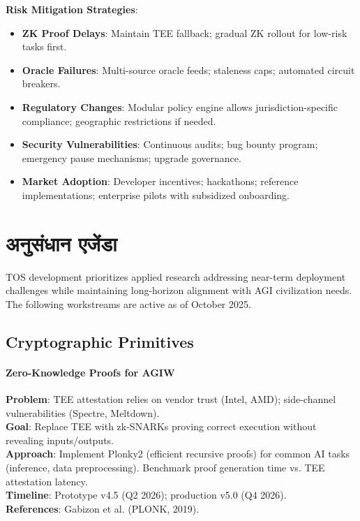\documentclass[11pt]{article}
\begin{document}
\begin{itemize}[noitemsep]
\begin{itemize}[noitemsep]
\begin{itemize}[noitemsep]
\begin{itemize}[noitemsep]
\begin{itemize}[noitemsep]
\begin{itemize}[noitemsep]
\textbf{Risk Mitigation Strategies}:
\begin{itemize}[noitemsep]
  \item \textbf{ZK Proof Delays}: Maintain TEE fallback; gradual ZK rollout for low-risk tasks first.
  \item \textbf{Oracle Failures}: Multi-source oracle feeds; staleness caps; automated circuit breakers.
  \item \textbf{Regulatory Changes}: Modular policy engine allows jurisdiction-specific compliance; geographic restrictions if needed.
  \item \textbf{Security Vulnerabilities}: Continuous audits; bug bounty program; emergency pause mechanisms; upgrade governance.
  \item \textbf{Market Adoption}: Developer incentives; hackathons; reference implementations; enterprise pilots with subsidized onboarding.
\end{itemize}

\section{अनुसंधान एजेंडा}
\label{sec:research}

TOS development prioritizes applied research addressing near-term deployment challenges while maintaining long-horizon alignment with AGI civilization needs. The following workstreams are active as of October 2025.

\subsection{Cryptographic Primitives}

\paragraph{Zero-Knowledge Proofs for AGIW}
\textbf{Problem}: TEE attestation relies on vendor trust (Intel, AMD); side-channel vulnerabilities (Spectre, Meltdown).\\
\textbf{Goal}: Replace TEE with zk-SNARKs proving correct execution without revealing inputs/outputs.\\
\textbf{Approach}: Implement Plonky2 (efficient recursive proofs) for common AI tasks (inference, data preprocessing). Benchmark proof generation time vs. TEE attestation latency.\\
\textbf{Timeline}: Prototype v4.5 (Q2 2026); production v5.0 (Q4 2026).\\
\textbf{References}: Gabizon et al. (PLONK, 2019).


\end{itemize}
\end{itemize}
\end{itemize}
\end{itemize}
\end{itemize}
\end{itemize}
\end{document}
